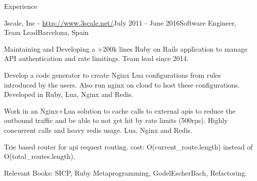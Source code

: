 \documentclass{resume} %
\begin{document}
\begin{rSection}{Experience}
\begin{rSubsection}{3scale, Inc - \url{http://www.3scale.net/}}{July 2011 - June 2016}{Software Engineer, Team Lead}{Barcelona, Spain}
\item Maintaining and Developing a +200k lines Ruby on Rails
  application to manage API authentication and rate limitings. Team
  lead since 2014.
\item Develop a code generator to create Nginx Lua configurations from
  rules introduced by the users. Also run nginx on cloud to host these
  configurations. Developed in Ruby, Lua, Nginx and Redis.
\item Work in an Nginx+Lua solution to cache calls to external apis to
  reduce the outbound traffic and be able to not get hit by rate
  limits (500rps). Highly concurrent calls and heavy redis usage. Lua,
  Nginx and Redis.
\item Trie based router for api request routing. cost:
  O(current\_route.length) instead of O(total\_routes.length).
\item Relevant Books: SICP, Ruby Metaprogramming, GodelEscherBach,
  Refactoring.
\end{rSubsection}





\end{rSection}
\end{document}
